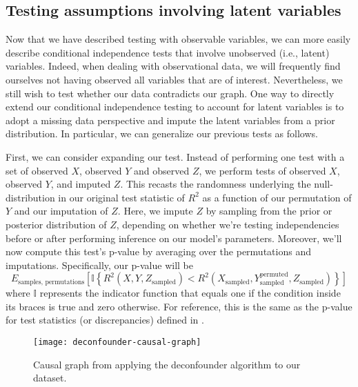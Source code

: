 \subsection{Testing assumptions involving latent variables}
\label{sec:latent-tests}
Now that we have described testing with observable variables, we can more easily describe conditional independence tests that involve unobserved (i.e., latent) variables.
Indeed, when dealing with observational data, we will frequently find ourselves not having observed all variables that are of interest.
Nevertheless, we still wish to test whether our data contradicts our graph.
One way to directly extend our conditional independence testing to account for latent variables is to adopt a missing data perspective and impute the latent variables from a prior distribution.
In particular, we can generalize our previous tests as follows.

First, we can consider expanding our test.
Instead of performing one test with a set of observed $X$, observed $Y$ and observed $Z$, we perform tests of observed $X$, observed $Y$, and imputed $Z$.
This recasts the randomness underlying the null-distribution in our original test statistic of $R^2$ as a function of our permutation of $Y$ and our imputation of $Z$.
Here, we impute $Z$ by sampling from the prior or posterior distribution of $Z$, depending on whether we're testing independencies before or after performing inference on our model's parameters.
Moreover, we'll now compute this test's p-value by averaging over the permutations and imputations.
Specifically, our p-value will be
\begin{equation}
E_{\textrm{samples, permutations}} \left[ \mathbb{I} \left \lbrace R^2 \left( X, Y, Z_{\textrm{sampled}} \right) <  R^2 \left( X_{\textrm{sampled}}, Y_{\textrm{sampled}} ^{\textrm{permuted}}, Z_{\textrm{sampled}} \right) \right \rbrace \right]
\end{equation}
where $\mathbb{I}$ represents the indicator function that equals one if the condition inside its braces is true and zero otherwise.
For reference, this is the same as the p-value for test statistics (or discrepancies) defined in \citet[Eq. 7]{gelman_1996_posterior}.

\begin{figure}
   \centering
   \texttt{[image: deconfounder-causal-graph]}
   \caption{Causal graph from applying the deconfounder algorithm \citep{wang_2019_blessings} to our dataset.}
   \label{fig:deconfounder-graph}
\end{figure}

